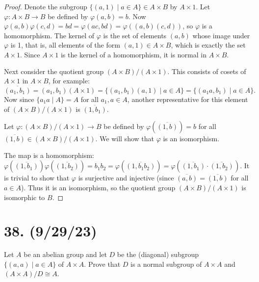\documentclass{article}
\begin{document}
\begin{proof}
    Denote the subgroup $\{ (a, 1) \mid a \in A \} \in A \times B$ by $A \times 1$. Let $\varphi: A \times B \rightarrow B$ be defined by $\varphi(a, b) = b$. Now $\varphi(a, b)\varphi(c, d) = bd = \varphi(ac, bd) = \varphi((a, b)(c, d))$, so $\varphi$ is a homomorphism. The kernel of $\varphi$ is the set of elements $(a, b)$ whose image under $\varphi$ is 1, that is, all elements of the form $(a, 1) \in A \times B$, which is exactly the set $A \times 1$. Since $A \times 1$ is the kernel of a homomorphism, it is normal in $A \times B$.

    Next consider the quotient group $(A \times B) / (A \times 1)$. This consists of cosets of $A \times 1$ in $A \times B$, for example:
    \begin{equation*}
        \overline{(a_1, b_1)} = (a_1, b_1)(A \times 1) = \{ (a_1, b_1)(a, 1) \mid a \in A \} = \{ (a_1 a, b_1) \mid a \in A \}.
    \end{equation*}
    Now since $\{ a_1 a \mid A \} = A$ for all $a_1, a \in A$, another representative for this element of $(A \times B) / (A \times 1)$ is $\overline{(1, b_1)}$.

    Let $\varphi: (A \times B) / (A \times 1) \rightarrow B$ be defined by $\varphi(\overline{(1, b)}) = b$ for all $\overline{(1, b)} \in (A \times B) / (A \times 1)$. We will show that $\varphi$ is an isomorphism.

    The map is a homomorphism: $\varphi(\overline{(1, b_1)})\varphi(\overline{(1, b_2)}) = b_1 b_2 = \varphi(\overline{(1, b_1 b_2)}) = \varphi(\overline{(1, b_1)} \cdot \overline{(1, b_2)})$. It is trivial to show that $\varphi$ is surjective and injective (since $\overline{(a, b)} = \overline{(1, b)}$ for all $a \in A$). Thus it is an isomorphism, so the quotient group $(A \times B) / (A \times 1)$ is isomorphic to $B$.
\end{proof}

\section*{38. (9/29/23)}

Let $A$ be an abelian group and let $D$ be the (diagonal) subgroup $\{ (a, a) \mid a \in A \}$ of $A \times A$. Prove that $D$ is a normal subgroup of $A \times A$ and $(A \times A) / D \cong A$.
\end{document}
